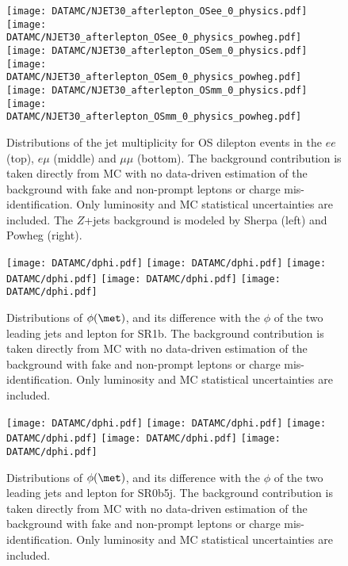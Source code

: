 \begin{figure}[htb!]
\centering
{\texttt{[image: DATAMC/NJET30\_afterlepton\_OSee\_0\_physics.pdf]}}
{\texttt{[image: DATAMC/NJET30\_afterlepton\_OSee\_0\_physics\_powheg.pdf]}}
{\texttt{[image: DATAMC/NJET30\_afterlepton\_OSem\_0\_physics.pdf]}}
{\texttt{[image: DATAMC/NJET30\_afterlepton\_OSem\_0\_physics\_powheg.pdf]}}
{\texttt{[image: DATAMC/NJET30\_afterlepton\_OSmm\_0\_physics.pdf]}}
{\texttt{[image: DATAMC/NJET30\_afterlepton\_OSmm\_0\_physics\_powheg.pdf]}}
\caption{Distributions of the jet multiplicity for OS dilepton events in the $ee$ (top), $e\mu$ (middle) and $\mu\mu$ (bottom). The background contribution is taken directly from MC with no data-driven estimation of the background with fake and non-prompt leptons or charge mis-identification. Only luminosity and MC statistical uncertainties are included. The $Z$+jets background is modeled by Sherpa (left) and Powheg (right).
}
\label{fig:app_Njet_PowhegSherpa}
\end{figure}


\begin{figure}[htb!]
\centering
{\texttt{[image: DATAMC/dphi.pdf]}}
{\texttt{[image: DATAMC/dphi.pdf]}}
{\texttt{[image: DATAMC/dphi.pdf]}}
{\texttt{[image: DATAMC/dphi.pdf]}}
{\texttt{[image: DATAMC/dphi.pdf]}}
\caption{Distributions of $\phi(\met)$, and its difference with the $\phi$ of the two leading jets and lepton for SR1b. The background contribution is taken directly from MC with no data-driven estimation of the background with fake and non-prompt leptons or charge mis-identification. Only luminosity and MC statistical uncertainties are included.
}
\label{fig:app_Dphi_SR1b}
\end{figure}


\begin{figure}[htb!]
\centering
{\texttt{[image: DATAMC/dphi.pdf]}}
{\texttt{[image: DATAMC/dphi.pdf]}}
{\texttt{[image: DATAMC/dphi.pdf]}}
{\texttt{[image: DATAMC/dphi.pdf]}}
{\texttt{[image: DATAMC/dphi.pdf]}}
\caption{Distributions of $\phi(\met)$, and its difference with the $\phi$ of the two leading jets and lepton for SR0b5j. The background contribution is taken directly from MC with no data-driven estimation of the background with fake and non-prompt leptons or charge mis-identification. Only luminosity and MC statistical uncertainties are included.
}
\label{fig:app_Dphi_SR0b5j}
\end{figure}

